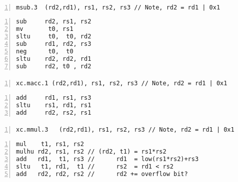 
\paragraph{}

\begin{lstlisting}[frame={single},numbers={left},title={\XCRYPTO}]
msub.3  (rd2,rd1), rs1, rs2, rs3 // Note, rd2 = rd1 | 0x1
\end{lstlisting}

\begin{lstlisting}[frame={single},numbers={left},title={RV32IM/RV64IM}]
sub     rd2, rs1, rs2
mv       t0, rs1
sltu     t0,  t0, rd2
sub     rd1, rd2, rs3
neg      t0,  t0
sltu    rd2, rd2, rd1
sub     rd2, t0 , rd2
\end{lstlisting}


\paragraph{}

\begin{lstlisting}[frame={single},numbers={left},title={\XCRYPTO}]
xc.macc.1 (rd2,rd1), rs1, rs2, rs3 // Note, rd2 = rd1 | 0x1
\end{lstlisting}

\begin{lstlisting}[frame={single},numbers={left},title={RV32IM/RV64IM}]
add     rd1, rs1, rs3
sltu    rs1, rd1, rs1
add     rd2, rs2, rs1
\end{lstlisting}


\paragraph{}

\begin{lstlisting}[frame={single},numbers={left},title={\XCRYPTO}]
xc.mmul.3   (rd2,rd1), rs1, rs2, rs3 // Note, rd2 = rd1 | 0x1
\end{lstlisting}

\begin{lstlisting}[frame=single, title={RV32IM/RV64IM},numbers=left]
mul    t1, rs1, rs2
mulhu rd2, rs1, rs2 // (rd2, t1) = rs1*rs2
add   rd1,  t1, rs3 //      rd1  = low(rs1*rs2)+rs3
sltu   t1, rd1,  t1 //      rs2  = rd1 < rs2
add   rd2, rd2, rs2 //      rd2 += overflow bit?
\end{lstlisting}

